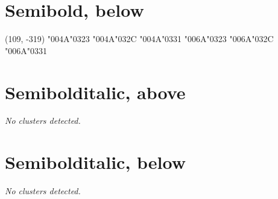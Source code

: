 \section*{Semibold, below}

(109, -319) \char"004A\cgj\char"0323 \char"004A\cgj\char"032C \char"004A\cgj\char"0331 \char"006A\cgj\char"0323 \char"006A\cgj\char"032C \char"006A\cgj\char"0331


\section*{Semibolditalic, above}

\emph{No clusters detected.}

\section*{Semibolditalic, below}

\emph{No clusters detected.}
